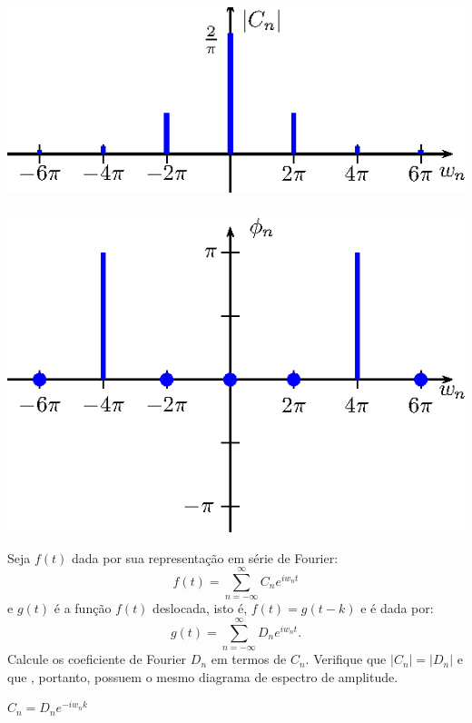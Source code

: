 \begin{resp}
\begin{itemize}
\includegraphics{cap_diagramas_espectro/pics/figura_23}~\includegraphics{cap_diagramas_espectro/pics/figura_24}

\end{itemize}
\end{resp}



\begin{exer} Seja $f(t)$ dada por sua representação em série de Fourier:
  $$f(t)=\sum_{n=-\infty}^\infty C_n e^{iw_n t }$$
e  $g(t)$ é a função $f(t)$ deslocada, isto é, $f(t)=g(t-k)$ e é dada por:
$$g(t)=\sum_{n=-\infty}^\infty D_n e ^{iw_n t }.$$
  Calcule os coeficiente de Fourier $D_n$ em termos de $C_n$. Verifique que $|C_n|=|D_n|$ e que , portanto, possuem o mesmo diagrama de espectro de amplitude.
\end{exer}
\begin{resp}
  $C_n = D_n e^{-iw_n k}$
\end{resp}